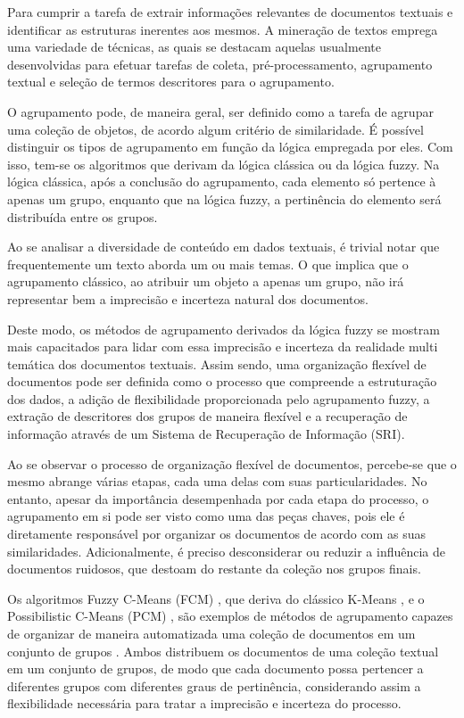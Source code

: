 Para cumprir a tarefa de extrair informações relevantes de documentos textuais e identificar as
estruturas inerentes aos mesmos. A mineração de textos emprega uma variedade de técnicas, as quais se
destacam aquelas usualmente desenvolvidas para efetuar tarefas de coleta, pré-processamento, agrupamento textual e seleção de termos descritores para o agrupamento. 

O agrupamento pode, de maneira geral, ser definido como a tarefa de agrupar uma coleção de objetos,
de acordo algum critério de similaridade. É possível distinguir os tipos de agrupamento em
função da lógica empregada por eles. Com isso, tem-se os algoritmos que derivam da lógica clássica ou
da lógica fuzzy. Na lógica clássica, após a conclusão do agrupamento, cada elemento só pertence à
apenas um grupo, enquanto que na lógica fuzzy, a pertinência do elemento será distribuída entre os
grupos. 

Ao se analisar a diversidade de conteúdo em dados textuais, é trivial notar que frequentemente
um texto aborda um ou mais temas. O que implica que o agrupamento clássico, ao atribuir um objeto a
apenas um grupo, não irá representar bem a imprecisão e incerteza natural dos documentos. 

Deste modo, os métodos de agrupamento derivados da lógica fuzzy se mostram mais capacitados para
lidar com essa imprecisão e incerteza da realidade multi temática dos documentos textuais. Assim
sendo, uma organização flexível de documentos pode ser definida como o processo que compreende a
estruturação dos dados, a adição de flexibilidade proporcionada pelo agrupamento fuzzy, a extração
de descritores dos grupos de maneira flexível e a recuperação de informação através de um Sistema de Recuperação de Informação (SRI).

Ao se observar o processo de organização flexível de documentos, percebe-se que o mesmo abrange
várias etapas, cada uma delas com suas particularidades. No entanto, apesar da importância
desempenhada por cada etapa do processo, o agrupamento em si pode ser visto como uma das peças
chaves, pois ele é diretamente responsável por organizar os documentos de acordo com as suas
similaridades. Adicionalmente, é preciso desconsiderar ou reduzir a influência de
documentos ruidosos, que destoam do restante da coleção nos grupos finais.

Os algoritmos Fuzzy C-Means (FCM) \cite{Bezdek1984}, que deriva do clássico K-Means
\cite{Macqueen1967}, e o Possibilistic C-Means (PCM)
\cite{Krishnapuram1993}, são exemplos de métodos de agrupamento capazes de organizar de maneira
automatizada uma coleção de documentos em um conjunto de grupos
\cite{Mei2014,Tjhi2009,Prade2008,Saracoglu2008}. Ambos distribuem os documentos de uma coleção
textual em um conjunto de grupos, de modo que cada documento possa pertencer a diferentes grupos com
diferentes graus de pertinência, considerando assim a flexibilidade necessária para tratar a
imprecisão e incerteza do processo.

